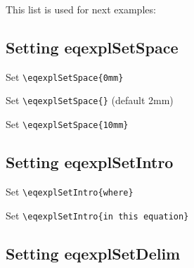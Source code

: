 \documentclass{article}
\begin{document}
This list is used for next examples:
\begin{eqexpl}
  \testList
\end{eqexpl}

\subsection{Setting eqexplSetSpace}

\noindent Set \verb+\eqexplSetSpace{0mm}+

\eqexplSetSpace{0mm}
\begin{eqexpl}
  \testList
\end{eqexpl}

\vspace{5mm}

\noindent Set \verb+\eqexplSetSpace{}+ (default 2mm)

\eqexplSetSpace{}
\begin{eqexpl}
  \testList
\end{eqexpl}

\vspace{5mm}

\noindent Set \verb+\eqexplSetSpace{10mm}+

\eqexplSetSpace{10mm}
\begin{eqexpl}
  \testList
\end{eqexpl}

\eqexplSetSpace{}

\subsection{Setting eqexplSetIntro}

\noindent Set \verb+\eqexplSetIntro{where}+

\begin{eqexpl}
  \testList
\end{eqexpl}

\vspace{5mm}

\noindent Set \verb+\eqexplSetIntro{in this equation}+

\begin{eqexpl}
  \testList
\end{eqexpl}

\eqexplSetIntro{}

\subsection{Setting eqexplSetDelim}
\end{document}
